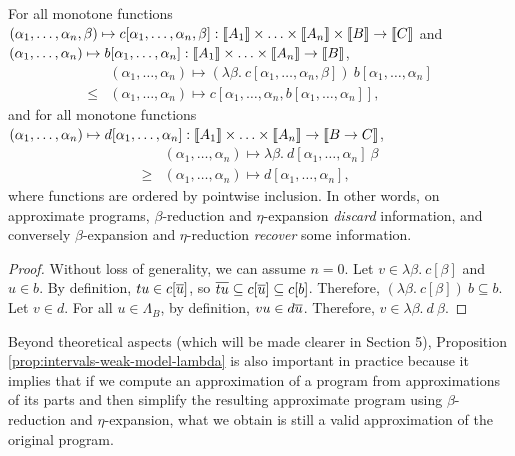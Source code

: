 \begin{proposition} \label{prop:intervals-weak-model-lambda} For all monotone functions $(\alpha_1, \ldots, \alpha_n, \beta) \mapsto c[\alpha_1, \ldots, \alpha_n, \beta] : \llbracket A_1 \rrbracket \times \ldots \times \llbracket A_n \rrbracket \times  \llbracket B \rrbracket \to \llbracket C \rrbracket$ and $(\alpha_1, \ldots, \alpha_n) \mapsto b[\alpha_1, \ldots, \alpha_n] : \llbracket A_1 \rrbracket \times \ldots \times \llbracket A_n \rrbracket \to \llbracket B \rrbracket$, $$\begin{array}{ll} & (\alpha_1, \ldots, \alpha_n) \mapsto (\lambda \beta.~  c[\alpha_1, \ldots, \alpha_n, \beta])~ b[\alpha_1, \ldots, \alpha_n] \\ \leq & (\alpha_1, \ldots, \alpha_n) \mapsto c[\alpha_1, \ldots, \alpha_n, b[\alpha_1, \ldots, \alpha_n]]\text{,}\end{array}$$
and for all monotone functions $(\alpha_1, \ldots, \alpha_n) \mapsto d[\alpha_1, \ldots, \alpha_n] : \llbracket A_1 \rrbracket \times \ldots \times \llbracket A_n \rrbracket \to  \llbracket B \to C \rrbracket$,
$$\begin{array}{ll} & (\alpha_1, \ldots, \alpha_n) \mapsto \lambda \beta.~  d[\alpha_1, \ldots, \alpha_n]~ \beta \\ \geq & (\alpha_1, \ldots, \alpha_n) \mapsto d[\alpha_1, \ldots, \alpha_n]\text{,}\end{array}$$
where functions are ordered by pointwise inclusion.  In other words, on approximate programs, $\beta$-reduction and $\eta$-expansion \emph{discard} information, and conversely $\beta$-expansion and $\eta$-reduction \emph{recover} some information.
\end{proposition}

\begin{proof} Without loss of generality, we can assume $n=0$.
Let $v \in \lambda \beta.~ c[\beta]$ and $u \in b$. By definition, $tu \in c[\overline{u}]$, so $\overline{tu} \subseteq c[\overline{u}] \subseteq c[b]$. Therefore, $(\lambda \beta.~ c[\beta])~ b \subseteq b$.
Let $v \in d$. For all $u \in \Lambda_B$, by definition, $vu \in d\overline{u}$. Therefore, $v \in \lambda \beta.~ d~ \beta$.
\end{proof}

Beyond theoretical aspects (which will be made clearer in Section 5), 
Proposition \ref{prop:intervals-weak-model-lambda} is also important in practice because it implies that if we compute an approximation of a program from approximations of its parts and then simplify the resulting approximate program using $\beta$-reduction and $\eta$-expansion, what we obtain is still a valid approximation of the original program.


